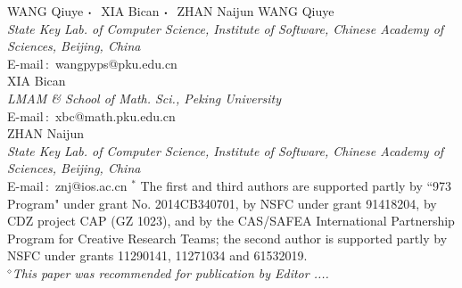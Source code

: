 \documentclass{jssc}
\def\cdd{\mbox{\boldmath$\cdot$}~}
\begin{document}
{WANG Qiuye $\cdd$ XIA Bican $\cdd$ ZHAN Naijun}%
{WANG Qiuye\\
{\it State Key Lab. of Computer Science, Institute of Software, Chinese Academy of Sciences, Beijing, China}\\
E-mail\,$:$ wangpyps@pku.edu.cn\\
XIA Bican\\
{\it LMAM \& School of Math. Sci., Peking University}\\
E-mail\,$:$ xbc@math.pku.edu.cn\\
ZHAN Naijun\\
{\it State Key Lab. of Computer Science, Institute of Software, Chinese Academy of Sciences, Beijing, China}\\
E-mail\,$:$ znj@ios.ac.cn}
{$^*$ The first and third authors are supported partly by ``973 Program" under grant No. 2014CB340701, by NSFC under grant 91418204, by CDZ project CAP (GZ 1023), and by the CAS/SAFEA International Partnership Program for Creative Research Teams; 
 the second author is supported partly by NSFC under grants 11290141, 11271034 and 61532019.\\
{$^\diamond${\it This paper was recommended for publication by
Editor .... }}}

\end{document}
